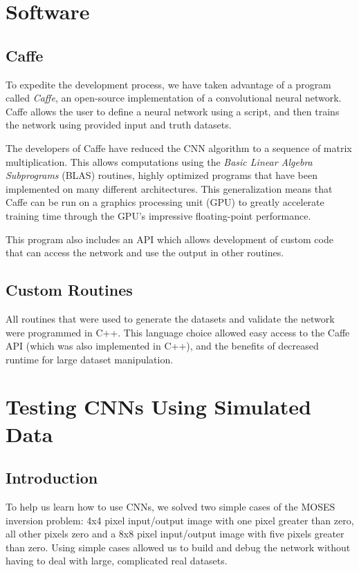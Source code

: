 \documentclass[twoside]{article}
\begin{document}
\begin{multicols}{2}
\section{Software}
\subsection{Caffe}
To expedite the development process, we have taken advantage of a program called \textit{Caffe}, an open-source implementation of a convolutional neural network. Caffe allows the user to define a neural network using a script, and then trains the network using provided input and truth datasets. \par The developers of Caffe have reduced the CNN algorithm to a sequence of matrix multiplication. This allows computations using the \textit{Basic Linear Algebra Subprograms} (BLAS) routines, highly optimized programs that have been implemented on many different architectures. This generalization means that Caffe can be run on a graphics processing unit (GPU) to greatly accelerate training time through the GPU's impressive floating-point performance. \par This program also includes an API which allows development of custom code that can access the network and use the output in other routines.
\subsection{Custom Routines}
All routines that were used to generate the datasets and validate the network were programmed in C++. This language choice allowed easy access to the Caffe API (which was also implemented in C++), and the benefits of decreased runtime for large dataset manipulation.

\section{Testing CNNs Using Simulated Data}
\subsection{Introduction}
To help us learn how to use CNNs, we solved two simple cases of the MOSES inversion problem: 4x4 pixel input/output image with one pixel greater than zero, all other pixels zero and a 8x8 pixel input/output image with five pixels greater than zero. Using simple cases allowed us to build and debug the network without having to deal with large, complicated real datasets.

\end{multicols}
\end{document}
